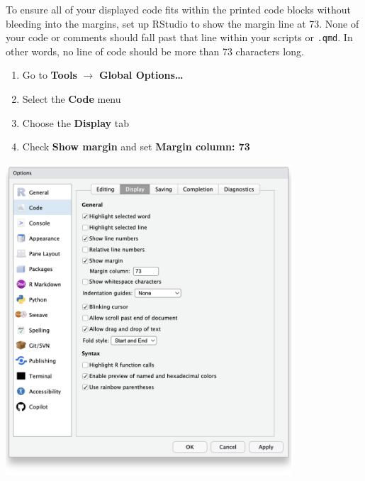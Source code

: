 \documentclass[
  11pt,
  letterpaper,
  twoside]{report}
\providecommand{\tightlist}{%
  \setlength{\itemsep}{0pt}\setlength{\parskip}{0pt}}\usepackage{longtable,booktabs,array}
\begin{document}
\begin{enumerate}
\begin{tcolorbox}
  \end{tcolorbox}

  \newpage{}

  \begin{tcolorbox}[enhanced jigsaw, coltitle=black, leftrule=.75mm, titlerule=0mm, rightrule=.15mm, toprule=.15mm, opacityback=0, colbacktitle=quarto-callout-caution-color!10!white, breakable, colback=white, left=2mm, opacitybacktitle=0.6, bottomtitle=1mm, bottomrule=.15mm, colframe=quarto-callout-caution-color-frame, title=\textcolor{quarto-callout-caution-color}{\faFire}\hspace{0.5em}{Caution}, arc=.35mm, toptitle=1mm]

  To ensure all of your displayed code fits within the printed code
  blocks without bleeding into the margins, set up RStudio to show the
  margin line at 73. None of your code or comments should fall past that
  line within your scripts or \texttt{.qmd}. In other words, no line of
  code should be more than 73 characters long.

  \begin{enumerate}
  \def\labelenumii{\arabic{enumii}.}
  \tightlist
  \item
    Go to \textbf{Tools} \(\rightarrow\) \textbf{Global Options\ldots{}}
  \item
    Select the \textbf{Code} menu
  \item
    Choose the \textbf{Display} tab
  \item
    Check \textbf{Show margin} and set \textbf{Margin column: 73}
  \end{enumerate}

  \begin{center}
  \includegraphics[width=0.8\textwidth,height=\textheight]{fig/temp_show-margin.png}
  \end{center}

  \end{tcolorbox}
\end{enumerate}
\end{document}
